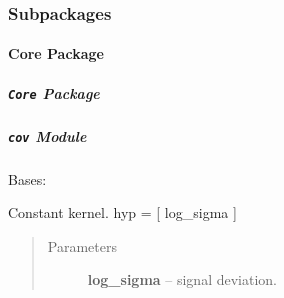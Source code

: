 \documentclass[letterpaper,10pt,english]{sphinxmanual}
\begin{document}
\subsubsection{Subpackages}
\label{pyGPs:subpackages}

\paragraph{Core Package}
\label{pyGPs.Core::doc}\label{pyGPs.Core:core-package}

\subparagraph{\texttt{Core} Package}
\label{pyGPs.Core:id1}\label{pyGPs.Core:module-pyGPs.Core}

\subparagraph{\texttt{cov} Module}
\label{pyGPs.Core:module-pyGPs.Core.cov}\label{pyGPs.Core:cov-module}

\begin{fulllineitems}
\label{pyGPs.Core:pyGPs.Core.cov.Const}
Bases: {\hyperref[pyGPs.Core:pyGPs.Core.cov.Kernel]{}}

Constant kernel. hyp = {[} log\_sigma {]}
\begin{quote}\begin{description}
\item[{Parameters}] \leavevmode
\textbf{log\_sigma} -- signal deviation.

\end{description}\end{quote}

\begin{fulllineitems}
\label{pyGPs.Core:pyGPs.Core.cov.Const.getCovMatrix}
\end{fulllineitems}


\begin{fulllineitems}
\label{pyGPs.Core:pyGPs.Core.cov.Const.getDerMatrix}
\end{fulllineitems}


\end{fulllineitems}
\end{document}
